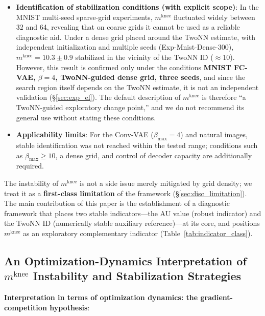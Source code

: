 \documentclass[make,article,submit,pdftex,moreauthors]{Definitions/mdpi}
\newcommand{\mknee}{m^{\mathrm{knee}}}
\begin{document}
\begin{itemize}
  \item \textbf{Identification of stabilization conditions (with explicit scope)}:
        In the MNIST multi-seed sparse-grid experiments, $\mknee$ fluctuated widely
        between 32 and 64, revealing that on coarse grids it cannot be used as a
        reliable diagnostic aid.
        Under a dense grid placed around the TwoNN estimate, with independent
        initialization and multiple seeds (Exp-Mnist-Dense-300), $\mknee = 10.3 \pm 0.9$
        stabilized in the vicinity of the TwoNN ID ($\approx 10$).
        However, this result is confirmed only under the conditions
        \textbf{MNIST FC-VAE, $\beta = 4$, TwoNN-guided dense grid, three seeds},
        and since the search region itself depends on the TwoNN estimate, it is not an
        independent validation (\S\ref{sec:exp_el}).
        The default description of $\mknee$ is therefore ``a TwoNN-guided exploratory
        change point,'' and we do not recommend its general use without stating these
        conditions.
  \item \textbf{Applicability limits}: For the Conv-VAE ($\beta_{\max}=4$) and natural
        images, stable identification was not reached within the tested range;
        conditions such as $\beta_{\max} \geq 10$, a dense grid, and control of decoder
        capacity are additionally required.
\end{itemize}

The instability of $\mknee$ is not a side issue merely mitigated by grid density;
we treat it as a \textbf{first-class limitation} of the framework
(\S\ref{sec:disc_limitation}).
The main contribution of this paper is the establishment of a diagnostic framework
that places two stable indicators---the AU value (robust indicator) and the TwoNN ID
(numerically stable auxiliary reference)---at its core, and positions $\mknee$ as an
exploratory complementary indicator (Table~\ref{tab:indicator_class}).

\subsection{An Optimization-Dynamics Interpretation of $\mknee$ Instability and Stabilization Strategies}\label{sec:disc_mknee_improve}

\textbf{Interpretation in terms of optimization dynamics: the gradient-competition hypothesis}:
\end{document}
